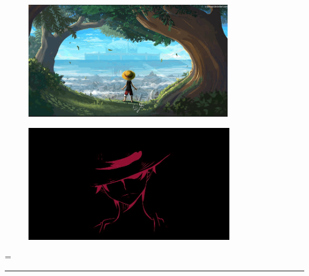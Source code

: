 \documentclass[9pt,letterpaper]{article}
\begin{document}
\begin{figure}[h]
    \centering
    \includegraphics[height=5cm]{Outputs/OP-gif2.png}
\end{figure}
\newpage
\begin{figure}[h]
    \centering
    \includegraphics[height=5cm]{Outputs/OP-gif3.png}
\end{figure}
=

\bigskip\bigskip
\hrule
\end{document}
